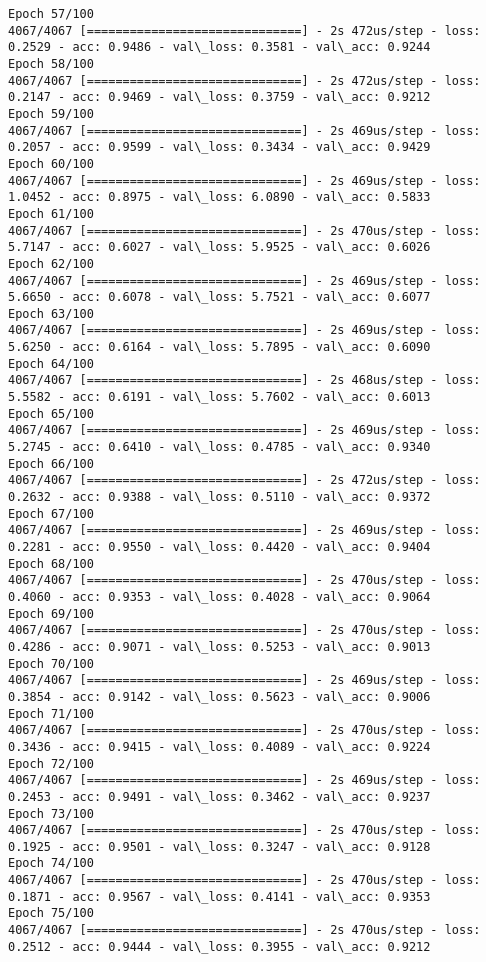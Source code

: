 \documentclass[11pt]{article}
\begin{document}
\begin{Verbatim}[commandchars=\\\{\}]
Epoch 57/100
4067/4067 [==============================] - 2s 472us/step - loss: 0.2529 - acc: 0.9486 - val\_loss: 0.3581 - val\_acc: 0.9244
Epoch 58/100
4067/4067 [==============================] - 2s 472us/step - loss: 0.2147 - acc: 0.9469 - val\_loss: 0.3759 - val\_acc: 0.9212
Epoch 59/100
4067/4067 [==============================] - 2s 469us/step - loss: 0.2057 - acc: 0.9599 - val\_loss: 0.3434 - val\_acc: 0.9429
Epoch 60/100
4067/4067 [==============================] - 2s 469us/step - loss: 1.0452 - acc: 0.8975 - val\_loss: 6.0890 - val\_acc: 0.5833
Epoch 61/100
4067/4067 [==============================] - 2s 470us/step - loss: 5.7147 - acc: 0.6027 - val\_loss: 5.9525 - val\_acc: 0.6026
Epoch 62/100
4067/4067 [==============================] - 2s 469us/step - loss: 5.6650 - acc: 0.6078 - val\_loss: 5.7521 - val\_acc: 0.6077
Epoch 63/100
4067/4067 [==============================] - 2s 469us/step - loss: 5.6250 - acc: 0.6164 - val\_loss: 5.7895 - val\_acc: 0.6090
Epoch 64/100
4067/4067 [==============================] - 2s 468us/step - loss: 5.5582 - acc: 0.6191 - val\_loss: 5.7602 - val\_acc: 0.6013
Epoch 65/100
4067/4067 [==============================] - 2s 469us/step - loss: 5.2745 - acc: 0.6410 - val\_loss: 0.4785 - val\_acc: 0.9340
Epoch 66/100
4067/4067 [==============================] - 2s 472us/step - loss: 0.2632 - acc: 0.9388 - val\_loss: 0.5110 - val\_acc: 0.9372
Epoch 67/100
4067/4067 [==============================] - 2s 469us/step - loss: 0.2281 - acc: 0.9550 - val\_loss: 0.4420 - val\_acc: 0.9404
Epoch 68/100
4067/4067 [==============================] - 2s 470us/step - loss: 0.4060 - acc: 0.9353 - val\_loss: 0.4028 - val\_acc: 0.9064
Epoch 69/100
4067/4067 [==============================] - 2s 470us/step - loss: 0.4286 - acc: 0.9071 - val\_loss: 0.5253 - val\_acc: 0.9013
Epoch 70/100
4067/4067 [==============================] - 2s 469us/step - loss: 0.3854 - acc: 0.9142 - val\_loss: 0.5623 - val\_acc: 0.9006
Epoch 71/100
4067/4067 [==============================] - 2s 470us/step - loss: 0.3436 - acc: 0.9415 - val\_loss: 0.4089 - val\_acc: 0.9224
Epoch 72/100
4067/4067 [==============================] - 2s 469us/step - loss: 0.2453 - acc: 0.9491 - val\_loss: 0.3462 - val\_acc: 0.9237
Epoch 73/100
4067/4067 [==============================] - 2s 470us/step - loss: 0.1925 - acc: 0.9501 - val\_loss: 0.3247 - val\_acc: 0.9128
Epoch 74/100
4067/4067 [==============================] - 2s 470us/step - loss: 0.1871 - acc: 0.9567 - val\_loss: 0.4141 - val\_acc: 0.9353
Epoch 75/100
4067/4067 [==============================] - 2s 470us/step - loss: 0.2512 - acc: 0.9444 - val\_loss: 0.3955 - val\_acc: 0.9212

\end{Verbatim}
\end{document}
